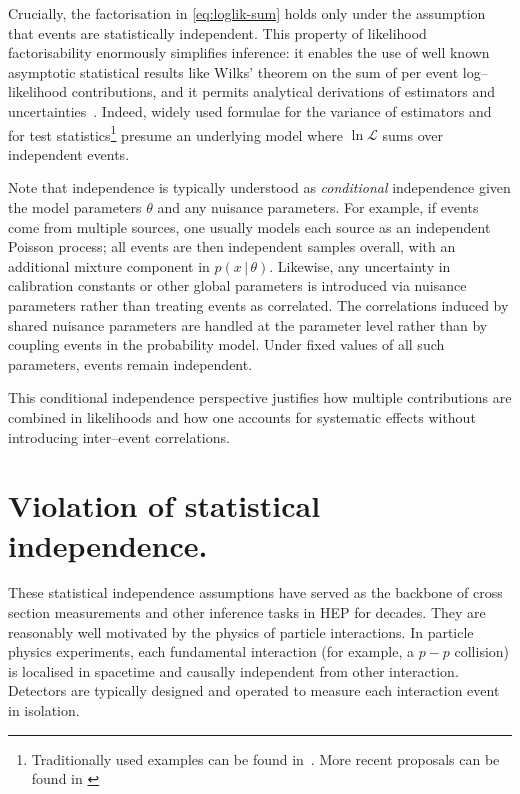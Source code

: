         Crucially, the factorisation in \cref{eq:loglik-sum} holds only under the assumption that events are statistically independent.
        This property of likelihood factorisability enormously simplifies inference: it enables the use of well known asymptotic statistical results like Wilks’ theorem on the sum of per event log--likelihood contributions, and it permits analytical derivations of estimators and uncertainties~\cite{Cowan2011AsymptoticPhysics}.
        Indeed, widely used formulae for the variance of estimators and for test statistics\footnote{Traditionally used examples can be found in~\cite{ParticleDataGroup:2022pth, ly_tutorial_2017}. More recent proposals can be found in \cite{Canonero:2023sua, Horoshko:2025yqj}} presume an underlying model where $\ln\mathcal{L}$ sums over independent events.
        
        Note that independence is typically understood as \emph{conditional} independence given the model parameters $\theta$ and any nuisance parameters.
        For example, if events come from multiple sources, one usually models each source as an independent Poisson process; all events are then independent samples overall, with an additional mixture component in $p(x\,|\,\theta)$.
        Likewise, any uncertainty in calibration constants or other global parameters is introduced via nuisance parameters rather than treating events as correlated.
        The correlations induced by shared nuisance parameters are handled at the parameter level rather than by coupling events in the probability model.
        Under fixed values of all such parameters, events remain independent.
        
        This conditional independence perspective justifies how multiple contributions are combined in likelihoods and how one accounts for systematic effects without introducing inter--event correlations.
\section{Violation of statistical independence.}
    \label{sec:violation-of-statistical-independence}
    These statistical independence assumptions have served as the backbone of cross section measurements and other inference tasks in HEP for decades.
    They are reasonably well motivated by the physics of particle interactions.
    In particle physics experiments, each fundamental interaction (for example, a \(p-p\) collision) is localised in spacetime and causally independent from other interaction.
    Detectors are typically designed and operated to measure each interaction event in isolation.
    
